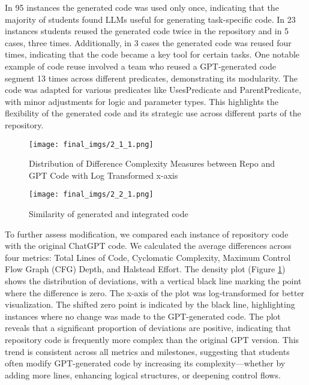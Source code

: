 In 95 instances the generated code was used only once, indicating that the majority of students found LLMs useful for generating task-specific code. In 23 instances students reused the generated code twice in the repository and in 5 cases, three times. Additionally, in 3 cases the generated code was reused four times, indicating that the code became a key tool for certain tasks. One notable example of code reuse involved a team who reused a GPT-generated code segment 13 times across different predicates, demonstrating its modularity. The code was adapted for various predicates like UsesPredicate and ParentPredicate, with minor adjustments for logic and parameter types. This highlights the flexibility of the generated code and its strategic use across different parts of the repository.


\begin{figure}[t]
    \centering
    \texttt{[image: final\_imgs/2\_1\_1.png]}
    \caption{Distribution of Difference Complexity Measures between Repo and GPT Code with Log Transformed x-axis}
    \label{fig:fig7}
\end{figure}


\begin{figure}[h]
    \centering
    \texttt{[image: final\_imgs/2\_2\_1.png]}
    \caption{Similarity of generated and integrated code}
    \label{fig:fig9}
\end{figure}
To further assess modification, we compared each instance of repository code with the original ChatGPT code. We calculated the average differences across four metrics: Total Lines of Code, Cyclomatic Complexity, Maximum Control Flow Graph (CFG) Depth, and Halstead Effort. The density plot (Figure \ref{fig:fig7}) shows the distribution of deviations, with a vertical black line marking the point where the difference is zero. The x-axis of the plot was log-transformed for better visualization. The shifted zero point is indicated by the black line, highlighting instances where no change was made to the GPT-generated code. The plot reveals that a significant proportion of deviations are positive, indicating that repository code is frequently more complex than the original GPT version. This trend is consistent across all metrics and milestones, suggesting that students often modify GPT-generated code by increasing its complexity—whether by adding more lines, enhancing logical structures, or deepening control flows. 

